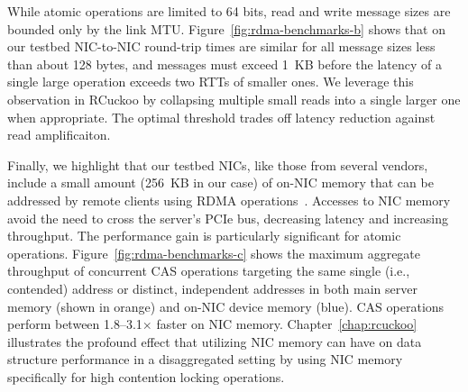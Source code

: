 \documentclass[12pt]{ucsddissertation}
\begin{document}

While atomic operations are limited to 64 bits, read and write message
sizes are bounded only by the link MTU.
Figure~\ref{fig:rdma-benchmarks-b} shows that on our testbed
NIC-to-NIC round-trip times are similar for all message sizes
less than about 128 bytes, and
messages must exceed 1~KB before the latency of a single large
operation exceeds two RTTs of smaller ones.  We leverage this
observation in RCuckoo by collapsing multiple small reads into a
single larger one when appropriate.  The optimal threshold trades off
latency reduction against read amplificaiton.


Finally, we highlight that our testbed NICs, like those from several
vendors, include a small amount (256~KB in our case) of on-NIC memory
that can be addressed by remote clients using RDMA
operations~\cite{device-memory}.  Accesses to NIC memory avoid the
need to cross the server's PCIe bus, decreasing latency and increasing
throughput.  The performance gain is particularly significant for
atomic operations.  Figure~\ref{fig:rdma-benchmarks-c} shows the
maximum aggregate throughput of concurrent CAS operations targeting
the same single (i.e., contended) address or distinct, independent
addresses in both main server memory (shown in orange) and on-NIC
device memory (blue).  CAS operations perform between 1.8--3.1$\times$
faster on NIC memory.  
Chapter~\ref{chap:rcuckoo} illustrates the profound effect that utilizing NIC memory can have on
data structure performance in a disaggregated setting by using NIC memory specifically for high
contention locking operations.


\end{document}
